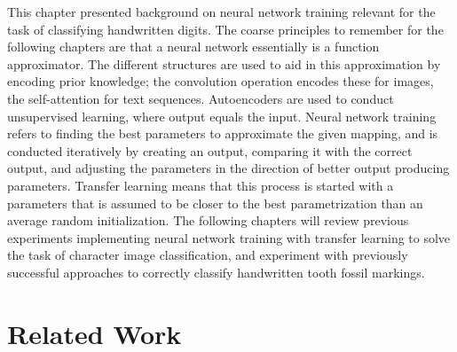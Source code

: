 \documentclass[english,twoside,openright]{UH_DS_MSc}
\begin{document}
This chapter presented background on neural network training relevant for the task 
of classifying handwritten digits. The coarse principles to remember for the following chapters 
are that a neural network essentially is a function approximator. The different structures are 
used to aid in this approximation by encoding prior knowledge; the convolution operation encodes these 
for images, the self-attention for text sequences. Autoencoders are used to conduct unsupervised
learning, where output equals the input. Neural network training refers to finding the best 
parameters to approximate the given mapping, and is conducted iteratively by creating 
an output, comparing it with the correct output, and adjusting the parameters in the direction 
of better output producing parameters. Transfer learning means that this process is started with a 
 parameters that is assumed to be closer to the best parametrization than an average 
random initialization. The following chapters will review previous experiments implementing 
neural network training with transfer learning to solve the task of character image classification, and experiment with previously successful approaches to correctly classify handwritten tooth fossil markings.

\chapter{Related Work}

\end{document}
